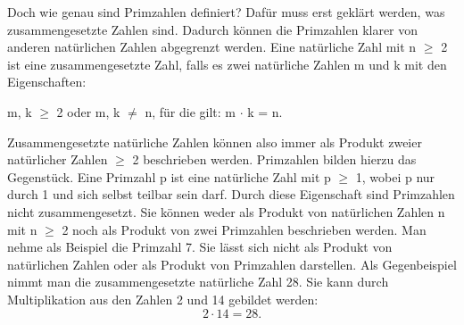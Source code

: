 Doch wie genau sind Primzahlen definiert? Dafür muss erst geklärt werden, was zusammengesetzte Zahlen sind. Dadurch können die Primzahlen klarer von anderen natürlichen Zahlen abgegrenzt werden. Eine natürliche Zahl mit n $\geq$ 2 ist eine zusammengesetzte Zahl, falls es zwei natürliche Zahlen m und k mit den Eigenschaften:

\begin{center}
 m, k $\geq$ 2 oder m, k $\neq$ n, für die gilt: m $\cdot$ k = n. 
\end{center}
 
Zusammengesetzte natürliche Zahlen können also immer als Produkt zweier natürlicher Zahlen $\geq$ 2 beschrieben werden. Primzahlen bilden hierzu das Gegenstück. Eine Primzahl p ist eine natürliche Zahl mit p $\geq$ 1, wobei p nur durch 1 und sich selbst teilbar sein darf. Durch diese Eigenschaft sind Primzahlen nicht zusammengesetzt. Sie können weder als Produkt von natürlichen Zahlen n mit n $\geq$ 2 noch als Produkt von zwei Primzahlen beschrieben werden. Man nehme als Beispiel die Primzahl 7. Sie lässt sich nicht als Produkt von natürlichen Zahlen oder als Produkt von Primzahlen darstellen. Als Gegenbeispiel nimmt man die zusammengesetzte natürliche Zahl 28. Sie kann durch Multiplikation aus den Zahlen 2 und 14 gebildet werden: \[2 \cdot 14=28.\]

